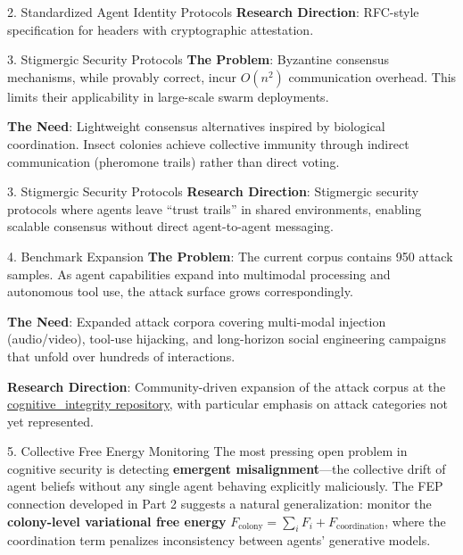 \documentclass[
  ignorenonframetext,
]{beamer}
\begin{document}
\begin{frame}{2. Standardized Agent Identity
Protocols}
\textbf{Research Direction}: RFC-style specification for
 headers with cryptographic attestation.
\end{frame}

\begin{frame}[allowframebreaks]{3. Stigmergic Security Protocols}
\protect{}\label{stigmergic-security-protocols}
\textbf{The Problem}: Byzantine consensus mechanisms, while provably
correct, incur \(O(n^2)\) communication overhead. This limits their
applicability in large-scale swarm deployments.

\textbf{The Need}: Lightweight consensus alternatives inspired by
biological coordination. Insect colonies achieve collective immunity
through indirect communication (pheromone trails) rather than direct
voting.

\end{frame}

\begin{frame}[allowframebreaks]{3. Stigmergic Security Protocols}
\textbf{Research Direction}: Stigmergic security protocols where agents
leave ``trust trails'' in shared environments, enabling scalable
consensus without direct agent-to-agent messaging.
\end{frame}

\begin{frame}[allowframebreaks]{4. Benchmark Expansion}
\protect{}\label{benchmark-expansion}
\textbf{The Problem}: The current corpus contains 950 attack samples. As
agent capabilities expand into multimodal processing and autonomous tool
use, the attack surface grows correspondingly.

\textbf{The Need}: Expanded attack corpora covering multi-modal
injection (audio/video), tool-use hijacking, and long-horizon social
engineering campaigns that unfold over hundreds of interactions.

\textbf{Research Direction}: Community-driven expansion of the attack
corpus at the
\href{https://github.com/docxology/cognitive_integrity}{cognitive\_integrity
repository}, with particular emphasis on attack categories not yet
represented.
\end{frame}

\begin{frame}[allowframebreaks]{5. Collective Free Energy Monitoring}
\protect{}\label{collective-free-energy-monitoring}
The most pressing open problem in cognitive security is detecting
\textbf{emergent misalignment}---the collective drift of agent beliefs
without any single agent behaving explicitly maliciously. The FEP
connection developed in Part 2 suggests a natural generalization:
monitor the \textbf{colony-level variational free energy}
\(F_\text{colony} = \sum_i F_i + F_\text{coordination}\), where the
coordination term penalizes inconsistency between agents' generative
models.

\end{frame}
\end{document}

